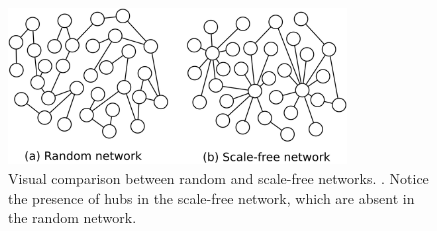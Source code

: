 \begin{figure}[htbp]
    \centering
    \includegraphics[width=0.8\textwidth]{figures/scalefree.png}
    \caption{Visual comparison between random and scale-free networks. \citep{wikipedia2023scalefree}. Notice the presence of hubs in the scale-free network, which are absent in the random network.}
    \label{fig:small_world}
\end{figure}

